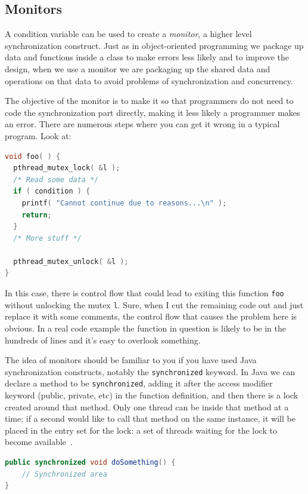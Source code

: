 \subsection*{Monitors}
A condition variable can be used to create a \textit{monitor}, a higher level synchronization construct. Just as in object-oriented programming we package up data and functions inside a class to make errors less likely and to improve the design, when we use a monitor we are packaging up the shared data and operations on that data to avoid problems of synchronization and concurrency.

The objective of the monitor is to make it so that programmers do not need to code the synchronization part directly, making it less likely a programmer makes an error. There are numerous steps where you can get it wrong in a typical program. Look at:

\begin{lstlisting}[language=C]
void foo( ) {
  pthread_mutex_lock( &l );
  /* Read some data */
  if ( condition ) {
    printf( "Cannot continue due to reasons...\n" );
    return;
  }
  /* More stuff */
   
  pthread_mutex_unlock( &l );
}
\end{lstlisting}

In this case, there is control flow that could lead to exiting this function \texttt{foo} without unlocking the mutex \texttt{l}. Sure, when I cut the remaining code out and just replace it with some comments, the control flow that causes the problem here is obvious. In a real code example the function in question is likely to be in the hundreds of lines and it's easy to overlook something.

The idea of monitors should be familiar to you if you have used Java synchronization constructs, notably the \texttt{synchronized} keyword. In Java we can declare a method to be \texttt{synchronized}, adding it after the access modifier keyword (public, private, etc) in the function definition, and then there is a lock created around that method. Only one thread can be inside that method at a time; if a second would like to call that method on the same instance, it will be placed in the entry set for the lock: a set of threads waiting for the lock to become available~\cite{osc}.

\begin{lstlisting}[language=Java]
public synchronized void doSomething() {
    // Synchronized area
}
\end{lstlisting}


